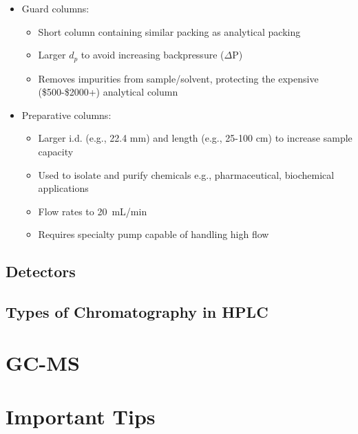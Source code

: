 \documentclass[a4paper, 12pt]{article}
\begin{document}
\begin{itemize}
	\item Guard columns:
	\begin{itemize}
		\item Short column containing similar packing as analytical packing
		\item Larger $d_p$ to avoid increasing backpressure ($\Delta$P)
		\item Removes impurities from sample/solvent, protecting the expensive (\$500-\$2000+) analytical column
	\end{itemize}
	\item Preparative columns:
	\begin{itemize}
		\item Larger i.d. (e.g., 22.4 mm) and length (e.g., 25-100 cm) to increase sample capacity
		\item Used to isolate and purify chemicals e.g., pharmaceutical, biochemical applications
		\item Flow rates to \SI{20}{mL/min}
		\item Requires specialty pump capable of handling high flow
	\end{itemize}
\end{itemize}


\subsection{Detectors}


\subsection{Types of Chromatography in HPLC}


\section{GC-MS}


\section{Important Tips}
\end{document}
